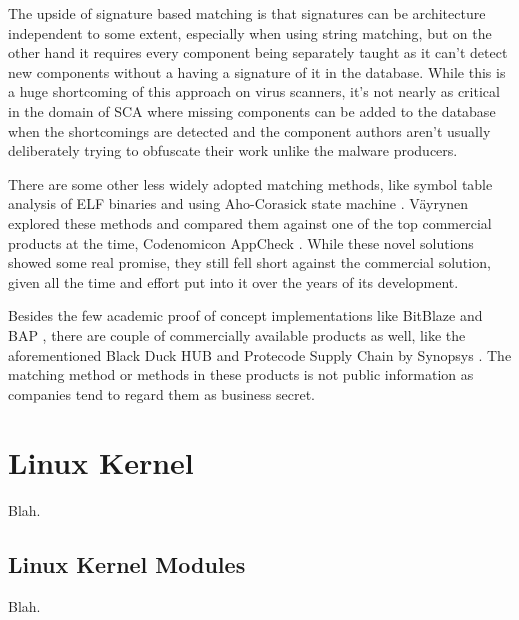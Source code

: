 The upside of signature based matching is that signatures can be architecture independent to some
extent, especially when using string matching, but on the other hand it requires every component
being separately taught as it can't detect new components without a having a signature of it in the
database. While this is a huge shortcoming of this approach on virus scanners, it's not nearly as
critical in the domain of SCA where missing components can be added to the database when the
shortcomings are detected and the component authors aren't usually deliberately trying to obfuscate
their work unlike the malware producers.

There are some other less widely adopted matching methods, like symbol table analysis of ELF
binaries and using Aho-Corasick state machine \cite{aho1975efficient}. Väyrynen explored these
methods and compared them against one of the top commercial products at the time, Codenomicon
AppCheck \cite{vayrynen2014finding}. While these novel solutions showed some real promise, they
still fell short against the commercial solution, given all the time and effort put into it over
the years of its development.

Besides the few academic proof of concept implementations like BitBlaze \cite{song2008bitblaze} and
BAP \cite{brumley2011bap}, there are couple of commercially available products as well, like the
aforementioned Black Duck HUB \cite{blackduckhub} and Protecode Supply Chain by Synopsys
\cite{synopsysprotecodesc}. The matching method or methods in these products is not public
information as companies tend to regard them as business secret.

\section{Linux Kernel}

Blah.

\subsection{Linux Kernel Modules}

Blah.
